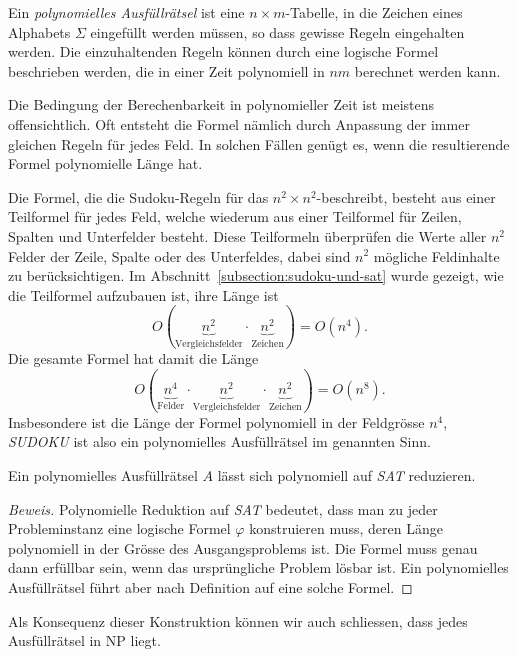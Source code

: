 \begin{definition}
Ein {\em polynomielles Ausfüllrätsel} ist eine $n\times m$-Tabelle,
in die Zeichen eines Alphabets $\Sigma$ eingefüllt werden müssen,
so dass gewisse Regeln eingehalten werden.
Die einzuhaltenden Regeln können durch eine logische Formel beschrieben
werden, die in einer Zeit polynomiell in $nm$ berechnet werden kann.
\end{definition}

Die Bedingung der Berechenbarkeit in polynomieller Zeit ist meistens
offensichtlich.
Oft entsteht die Formel nämlich durch Anpassung der immer gleichen
Regeln für jedes Feld.
In solchen Fällen genügt es, wenn die resultierende Formel polynomielle
Länge hat.

\begin{beispiel}
Die Formel, die die Sudoku-Regeln für das $n^2\times n^2$-beschreibt,
besteht aus einer 
Teilformel für jedes Feld, welche wiederum aus einer Teilformel
für Zeilen, Spalten und Unterfelder besteht.
Diese Teilformeln überprüfen die Werte aller $n^2$ Felder der Zeile,
Spalte oder des Unterfeldes, dabei sind $n^2$ mögliche Feldinhalte
zu berücksichtigen.
Im Abschnitt~\ref{subsection:sudoku-und-sat} wurde gezeigt, wie die
Teilformel aufzubauen ist, ihre Länge ist
\[
O(\underbrace{n^2}_{\text{Vergleichsfelder}}\cdot
\underbrace{n^2}_{\text{Zeichen}}) = O(n^4).
\]
Die gesamte Formel hat damit die Länge
\[
O(\underbrace{n^4}_{\text{Felder}}\cdot
\underbrace{n^2}_{\text{Vergleichsfelder}}\cdot
\underbrace{n^2}_{\text{Zeichen}}) = O(n^8).
\]
Insbesondere ist die Länge der Formel polynomiell in der Feldgrösse $n^4$,
\textsl{SUDOKU}
ist also ein polynomielles Ausfüllrätsel im genannten Sinn.
\end{beispiel}

\begin{satz}
Ein polynomielles Ausfüllrätsel $A$ lässt sich polynomiell auf 
\textsl{SAT} reduzieren.
\end{satz}

\begin{proof}[Beweis]
Polynomielle Reduktion auf \textsl{SAT} bedeutet, dass man zu jeder
Probleminstanz eine logische Formel $\varphi$ konstruieren muss,
deren Länge polynomiell in der Grösse des Ausgangsproblems ist.
Die Formel muss genau dann erfüllbar sein, wenn das ursprüngliche
Problem lösbar ist.
Ein polynomielles Ausfüllrätsel führt aber nach Definition auf
eine solche Formel.
\end{proof}

Als Konsequenz dieser Konstruktion können wir auch schliessen, dass
jedes Ausfüllrätsel in NP liegt.

